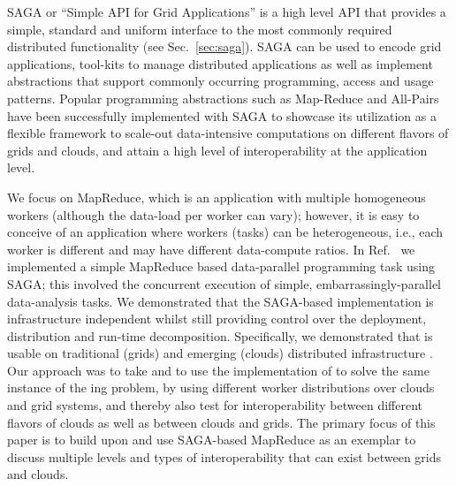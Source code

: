 \documentclass[3p,twocolumn]{elsarticle}
\begin{document}




SAGA or “Simple API for Grid Applications” is a high level API that
provides a simple, standard and uniform interface to the most commonly
required distributed functionality (see Sec.~\ref{sec:saga}). SAGA can
be used to encode grid applications, tool-kits to manage distributed
applications as well as implement abstractions that support commonly
occurring programming, access and usage patterns. Popular programming
abstractions such as Map-Reduce and All-Pairs \cite{allpairs} have been successfully
implemented with SAGA to showcase its utilization as a flexible
framework to scale-out data-intensive computations on different flavors
of grids and clouds, and attain a high level of interoperability at the
application level. 
 
We focus on MapReduce, which is an application with multiple homogeneous
workers (although the data-load per worker can vary); however, it is
easy to conceive of an application where workers (tasks) can be
heterogeneous, i.e., each worker is different and may have different
data-compute ratios.  In Ref.~\cite{saga_ccgrid09} we implemented
a simple MapReduce based data-parallel programming task using SAGA; this
involved the concurrent execution of simple, embarrassingly-parallel
data-analysis tasks.  We demonstrated that the SAGA-based implementation
is infrastructure independent whilst still providing control over the
deployment, distribution and run-time decomposition.  Specifically, we
demonstrated that \sagamapreduce is usable on traditional (grids) and
emerging (clouds) distributed infrastructure .  Our
approach was to take \sagamapreduce and to use the 
implementation of \sagamapreduce to solve the same instance of the 
{\wc}ing problem, by using different worker distributions over clouds
and grid systems, and thereby also test for interoperability between
different flavors of clouds as well as between clouds and grids.  The
primary focus of this paper is to build upon and use SAGA-based
MapReduce as an exemplar to discuss multiple levels and types of
interoperability that can exist between grids and clouds. 
\end{document}
